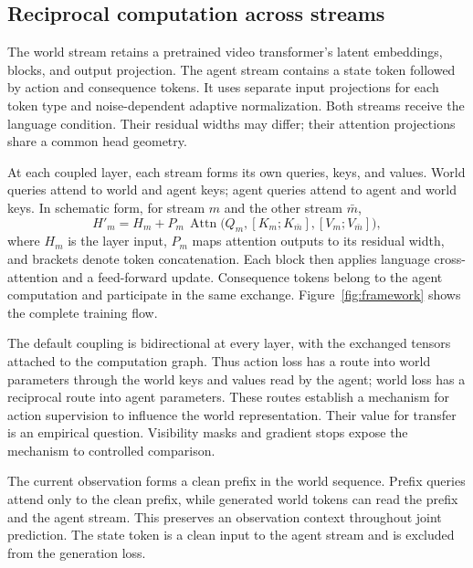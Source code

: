 

\subsection{Reciprocal computation across streams}
The world stream retains a pretrained video transformer's latent embeddings, blocks, and output
projection. The agent stream contains a state token followed by action and consequence tokens. It
uses separate input projections for each token type and noise-dependent adaptive normalization. Both
streams receive the language condition. Their residual widths may differ; their attention
projections share a common head geometry.

At each coupled layer, each stream forms its own queries, keys, and values. World queries attend to
world and agent keys; agent queries attend to agent and world keys. In schematic form, for stream
$m$ and the other stream $\bar m$,
\begin{equation}
 H'_m=H_m+P_m\,\operatorname{Attn}
 \bigl(Q_m,[K_m;K_{\bar m}],[V_m;V_{\bar m}]\bigr),
 \label{eq:coupling}
\end{equation}
where $H_m$ is the layer input, $P_m$ maps attention outputs to its residual width, and brackets
denote token concatenation. Each block then applies language cross-attention and a feed-forward
update. Consequence tokens belong to the agent computation and participate in the same exchange.
Figure~\ref{fig:framework} shows the complete training flow.

The default coupling is bidirectional at every layer, with the exchanged tensors attached to the
computation graph. Thus action loss has a route into world parameters through the world keys and
values read by the agent; world loss has a reciprocal route into agent parameters. These routes
establish a mechanism for action supervision to influence the world representation. Their value for
transfer is an empirical question. Visibility masks and gradient stops expose the mechanism to
controlled comparison.

The current observation forms a clean prefix in the world sequence. Prefix queries attend only to
the clean prefix, while generated world tokens can read the prefix and the agent stream. This
preserves an observation context throughout joint prediction. The state token is a clean input to
the agent stream and is excluded from the generation loss.

